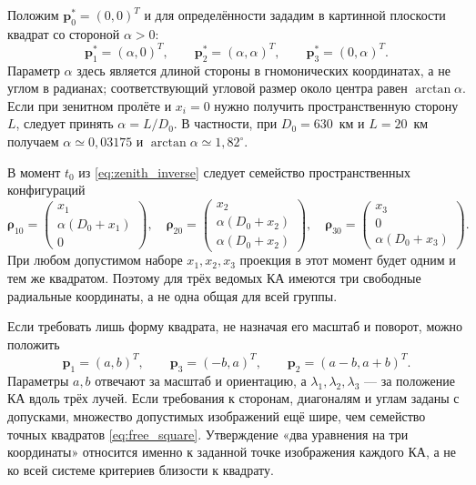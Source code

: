 \documentclass[a4paper,12pt]{article}
\begin{document}
Положим $\mathbf p_0^*=(0,0)^T$ и для определённости зададим в картинной плоскости квадрат со стороной $\alpha>0$:
\begin{equation}
    \mathbf p_1^*=(\alpha,0)^T,
    \qquad
    \mathbf p_2^*=(\alpha,\alpha)^T,
    \qquad
    \mathbf p_3^*=(0,\alpha)^T.
    \label{eq:target_square}
\end{equation}
Параметр $\alpha$ здесь является длиной стороны в гномонических координатах, а не углом в радианах; соответствующий угловой размер около центра равен $\arctan\alpha$. Если при зенитном пролёте и $x_i=0$ нужно получить пространственную сторону $L$, следует принять $\alpha=L/D_0$. В частности, при $D_0=630$~км и $L=20$~км получаем $\alpha\simeq0{,}03175$ и $\arctan\alpha\simeq1{,}82^\circ$.

В момент $t_0$ из \eqref{eq:zenith_inverse} следует семейство пространственных конфигураций
\begin{equation}
    \boldsymbol\rho_{10}=\begin{pmatrix}x_1\\\alpha(D_0+x_1)\\0\end{pmatrix},
    \quad
    \boldsymbol\rho_{20}=\begin{pmatrix}x_2\\\alpha(D_0+x_2)\\\alpha(D_0+x_2)\end{pmatrix},
    \quad
    \boldsymbol\rho_{30}=\begin{pmatrix}x_3\\0\\\alpha(D_0+x_3)\end{pmatrix}.
    \label{eq:four_spacecraft_initial_positions}
\end{equation}
При любом допустимом наборе $x_1,x_2,x_3$ проекция в этот момент будет одним и тем же квадратом. Поэтому для трёх ведомых КА имеются три свободные радиальные координаты, а не одна общая для всей группы.

Если требовать лишь форму квадрата, не назначая его масштаб и поворот, можно положить
\begin{equation}
    \mathbf p_1=(a,b)^T,\qquad
    \mathbf p_3=(-b,a)^T,\qquad
    \mathbf p_2=(a-b,a+b)^T.
    \label{eq:free_square}
\end{equation}
Параметры $a,b$ отвечают за масштаб и ориентацию, а $\lambda_1,\lambda_2,\lambda_3$ --- за положение КА вдоль трёх лучей. Если требования к сторонам, диагоналям и углам заданы с допусками, множество допустимых изображений ещё шире, чем семейство точных квадратов \eqref{eq:free_square}. Утверждение «два уравнения на три координаты» относится именно к заданной точке изображения каждого КА, а не ко всей системе критериев близости к квадрату.
\end{document}

